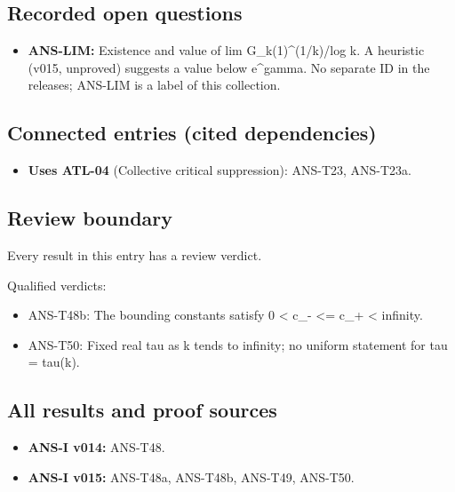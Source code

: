 \documentclass[
  11pt,
]{article}
\providecommand{\tightlist}{%
  \setlength{\itemsep}{0pt}\setlength{\parskip}{0pt}}
\begin{document}
\hypertarget{recorded-open-questions-7}{%
\subsection{Recorded open questions}\label{recorded-open-questions-7}}

\begin{itemize}
\tightlist
\item
  \textbf{ANS-LIM:} Existence and value of lim G\_k(1)\^{}(1/k)/log k. A
  heuristic (v015, unproved) suggests a value below e\^{}gamma. No
  separate ID in the releases; ANS-LIM is a label of this collection.
\end{itemize}

\hypertarget{connected-entries-cited-dependencies-8}{%
\subsection{Connected entries (cited
dependencies)}\label{connected-entries-cited-dependencies-8}}

\begin{itemize}
\tightlist
\item
  \textbf{Uses ATL-04} (Collective critical suppression): ANS-T23,
  ANS-T23a.
\end{itemize}

\hypertarget{review-boundary-8}{%
\subsection{Review boundary}\label{review-boundary-8}}

Every result in this entry has a review verdict.

Qualified verdicts:

\begin{itemize}
\tightlist
\item
  ANS-T48b: The bounding constants satisfy 0 \textless{} c\_- \textless=
  c\_+ \textless{} infinity.
\item
  ANS-T50: Fixed real tau as k tends to infinity; no uniform statement
  for tau = tau(k).
\end{itemize}

\hypertarget{all-results-and-proof-sources-8}{%
\subsection{All results and proof
sources}\label{all-results-and-proof-sources-8}}

\begin{itemize}
\tightlist
\item
  \textbf{ANS-I v014:} ANS-T48.
\item
  \textbf{ANS-I v015:} ANS-T48a, ANS-T48b, ANS-T49, ANS-T50.
\end{itemize}
\end{document}
